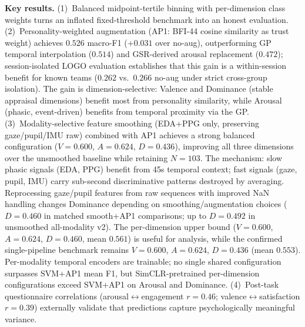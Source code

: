 \documentclass[sigconf,nonacm]{acmart}
\begin{document}
\begin{sloppypar}
\textbf{Key results.}
(1)~Balanced midpoint-tertile binning with per-dimension class weights
turns an inflated fixed-threshold benchmark into an honest evaluation.
(2)~Personality-weighted augmentation (AP1: BFI-44 cosine similarity as
trust weight) achieves $0.526$ macro-F1 ($+0.031$ over no-aug),
outperforming GP temporal interpolation ($0.514$) and GSR-derived arousal
replacement ($0.472$); session-isolated LOGO evaluation establishes that
this gain is a within-session benefit for known teams ($0.262$ vs.\ $0.266$
no-aug under strict cross-group isolation).
The gain is dimension-selective: Valence and Dominance (stable appraisal
dimensions) benefit most from personality similarity, while Arousal
(phasic, event-driven) benefits from temporal proximity via the GP.
(3)~Modality-selective feature smoothing (EDA+PPG only, preserving
gaze/pupil/IMU raw) combined with AP1 achieves a strong balanced
configuration ($V{=}0.600$, $A{=}0.624$, $D{=}0.436$), improving all
three dimensions over the unsmoothed baseline while retaining $N{=}103$.
The mechanism: slow phasic signals (EDA, PPG) benefit from 45s temporal
context; fast signals (gaze, pupil, IMU) carry sub-second discriminative
patterns destroyed by averaging.
Reprocessing gaze/pupil features from raw sequences with improved NaN handling
changes Dominance depending on smoothing/augmentation choices
($D{=}0.460$ in matched smooth+AP1 comparisons; up to $D{=}0.492$ in
unsmoothed all-modality v2).
The per-dimension upper bound
($V{=}0.600$, $A{=}0.624$, $D{=}0.460$, mean $0.561$) is useful for analysis,
while the confirmed single-pipeline benchmark remains
$V{=}0.600$, $A{=}0.624$, $D{=}0.436$ (mean $0.553$).
Per-modality temporal encoders are trainable; no single shared configuration
surpasses SVM+AP1 mean F1, but SimCLR-pretrained per-dimension configurations
exceed SVM+AP1 on Arousal and Dominance.
(4)~Post-task questionnaire correlations (arousal$\leftrightarrow$engagement
$r{=}0.46$; valence$\leftrightarrow$satisfaction $r{=}0.39$) externally
validate that predictions capture psychologically meaningful variance.
\end{sloppypar}
\end{document}
